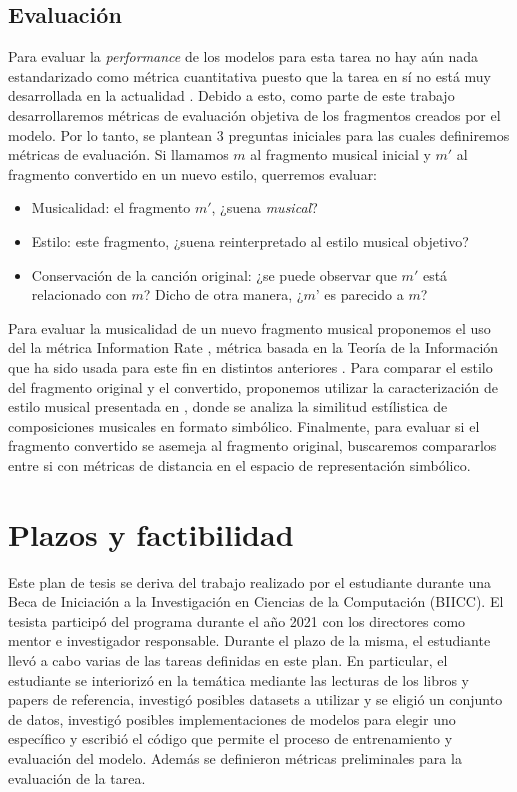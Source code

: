 \documentclass[10pt]{article}
\begin{document}
\subsection*{Evaluación}
Para evaluar la \textit{performance} de los modelos para esta tarea no hay aún
nada estandarizado como métrica cuantitativa puesto que la tarea en sí no está
muy desarrollada en la actualidad \cite{briot2020deep}. 
Debido a esto, como parte de este trabajo desarrollaremos métricas de
evaluación objetiva de los fragmentos creados por el modelo.  Por lo tanto, se
plantean 3 preguntas iniciales para las cuales definiremos métricas de
evaluación. Si llamamos $m$ al fragmento musical inicial y $m'$ al fragmento
convertido en un nuevo estilo, querremos evaluar: 

\begin{itemize}
    \item Musicalidad: el fragmento $m'$, ¿suena \textit{musical}?
    \item Estilo: este fragmento, ¿suena reinterpretado al estilo musical
      objetivo?
    \item Conservación de la canción original: ¿se puede observar que $m'$ 
    está relacionado con $m$? Dicho de otra manera, ¿$m’$ es parecido a $m$?
\end{itemize}

Para evaluar la musicalidad de un nuevo fragmento musical proponemos el uso del
la métrica Information Rate \cite{lattner2018},
métrica basada en la Teoría de la Información \cite{shannon1948} que ha sido
usada para este fin en distintos anteriores \cite{lattner2018, WangDubnov2015}.
Para comparar el estilo del fragmento original y el convertido, proponemos
utilizar la caracterización de estilo musical presentada en \cite{zivic2013},
donde se analiza la similitud estílistica de composiciones musicales en formato
simbólico. Finalmente, para evaluar si el fragmento convertido se asemeja al
fragmento original, buscaremos compararlos entre si con métricas de distancia
en el espacio de representación simbólico.

\section*{Plazos y factibilidad}

Este plan de tesis se deriva del trabajo realizado por el estudiante durante
una Beca de Iniciación a la Investigación en Ciencias de la Computación
(BIICC). El tesista participó del programa durante el año 2021 con los
directores como mentor e investigador responsable. 
Durante el plazo de la misma, el estudiante llevó a cabo varias de las tareas
definidas en este plan. En particular, el estudiante se interiorizó en la
temática mediante las lecturas de los libros y papers de referencia, investigó
posibles datasets a utilizar y se eligió un conjunto de datos, investigó
posibles implementaciones de modelos para elegir uno específico y escribió el
código que permite el proceso de entrenamiento y evaluación del modelo. Además
se definieron métricas preliminales para la evaluación de la tarea.
\end{document}
